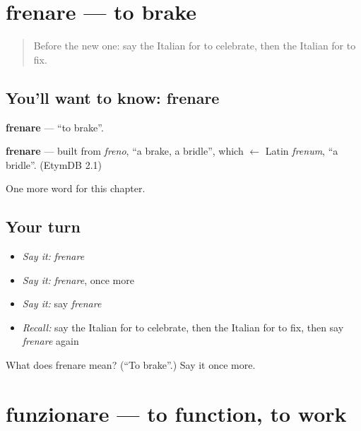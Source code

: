 \section[frenare]{frenare — to brake}

\label{lesson:IT-C149-frenare}



\begin{quote}
Before the new one: say the Italian for to celebrate, then the Italian for to fix.
\end{quote}

\subsection*{You'll want to know: frenare}
\textbf{frenare} — \textquotedblleft{}to brake\textquotedblright{}.

\begin{cousinweb}
\textbf{frenare} — built from \emph{freno}, \textquotedblleft{}a brake, a bridle\textquotedblright{}, which $\leftarrow$ Latin \emph{frenum}, \textquotedblleft{}a bridle\textquotedblright{}. (EtymDB 2.1)
\end{cousinweb}

\begin{grammarlens}[title={What you've built}]
One more word for this chapter.
\end{grammarlens}

\subsection*{Your turn}
\begin{itemize}
\raggedright
  \item \emph{Say it:} \emph{frenare}
  \item \emph{Say it:} \emph{frenare}, once more
  \item \emph{Say it:} say \emph{frenare}
  \item \emph{Recall:} say the Italian for to celebrate, then the Italian for to fix, then say \emph{frenare} again
\end{itemize}

\begin{tcolorbox}[breakable,colback=teal!4,colframe=teal!35!black,title={Before you move on}]
What does frenare mean? (\textquotedblleft{}To brake\textquotedblright{}.) Say it once more.
\end{tcolorbox}
\section[funzionare]{funzionare — to function, to work}

